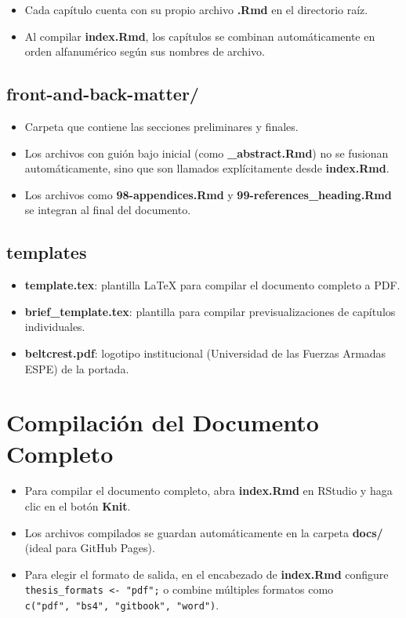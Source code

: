 \documentclass[a4paper, nobind]{templates/ociamthesis}
\providecommand{\tightlist}{%
  \setlength{\itemsep}{0pt}\setlength{\parskip}{0pt}}
\begin{document}
\begin{itemize}
\tightlist
\item
  Cada capítulo cuenta con su propio archivo \textbf{.Rmd} en el directorio raíz.
\item
  Al compilar \textbf{index.Rmd}, los capítulos se combinan automáticamente en orden alfanumérico según sus nombres de archivo.
\end{itemize}

\subsection{\texorpdfstring{\textbf{front-and-back-matter/}}{front-and-back-matter/}}\label{front-and-back-matter}

\begin{itemize}
\tightlist
\item
  Carpeta que contiene las secciones preliminares y finales.
\item
  Los archivos con guión bajo inicial (como \textbf{\_abstract.Rmd}) no se fusionan automáticamente, sino que son llamados explícitamente desde \textbf{index.Rmd}.
\item
  Los archivos como \textbf{98-appendices.Rmd} y \textbf{99-references\_heading.Rmd} se integran al final del documento.
\end{itemize}

\subsection{\texorpdfstring{\textbf{templates}}{templates}}\label{templates}

\begin{itemize}
\tightlist
\item
  \textbf{template.tex}: plantilla LaTeX para compilar el documento completo a PDF.
\item
  \textbf{brief\_template.tex}: plantilla para compilar previsualizaciones de capítulos individuales.
\item
  \textbf{beltcrest.pdf}: logotipo institucional (Universidad de las Fuerzas Armadas ESPE) de la portada.
\end{itemize}

\section{Compilación del Documento Completo}\label{compilaciuxf3n-del-documento-completo}

\begin{itemize}
\tightlist
\item
  Para compilar el documento completo, abra \textbf{index.Rmd} en RStudio y haga clic en el botón \textbf{Knit}.
\item
  Los archivos compilados se guardan automáticamente en la carpeta \textbf{docs/} (ideal para GitHub Pages).
\item
  Para elegir el formato de salida, en el encabezado de \textbf{index.Rmd} configure \texttt{thesis\_formats\ \textless{}-\ "pdf";} o combine múltiples formatos como \texttt{c("pdf",\ "bs4",\ "gitbook",\ "word")}.
\end{itemize}
\end{document}
